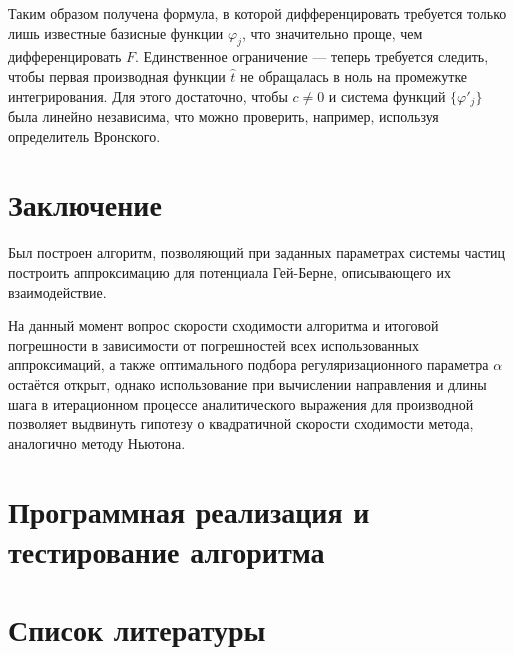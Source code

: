 \documentclass[a4paper,14pt]{extarticle}
\begin{document}
    Таким образом получена формула, в которой дифференцировать требуется только лишь известные базисные функции $\varphi_j$, что значительно проще, чем дифференцировать $F$. Единственное ограничение --- теперь требуется следить, чтобы первая производная функции $\hat{t}$ не обращалась в ноль на промежутке интегрирования. Для этого достаточно, чтобы $c \neq 0$ и система функций $\{\varphi'_j \}$ была линейно независима, что можно проверить, например, используя определитель Вронского.

    \newpage

    \section*{Заключение}

    Был построен алгоритм, позволяющий при заданных параметрах системы частиц построить аппроксимацию для потенциала Гей-Берне, описывающего их взаимодействие.

    На данный момент вопрос скорости сходимости алгоритма и итоговой погрешности в зависимости от погрешностей всех использованных аппроксимаций, а также оптимального подбора регуляризационного параметра $\alpha$ остаётся открыт, однако использование при вычислении направления и длины шага в итерационном процессе аналитического выражения для производной позволяет выдвинуть гипотезу о квадратичной скорости сходимости метода, аналогично методу Ньютона.

    \newpage

    \section{Программная реализация и тестирование алгоритма}



    \section*{Список литературы}
\end{document}
